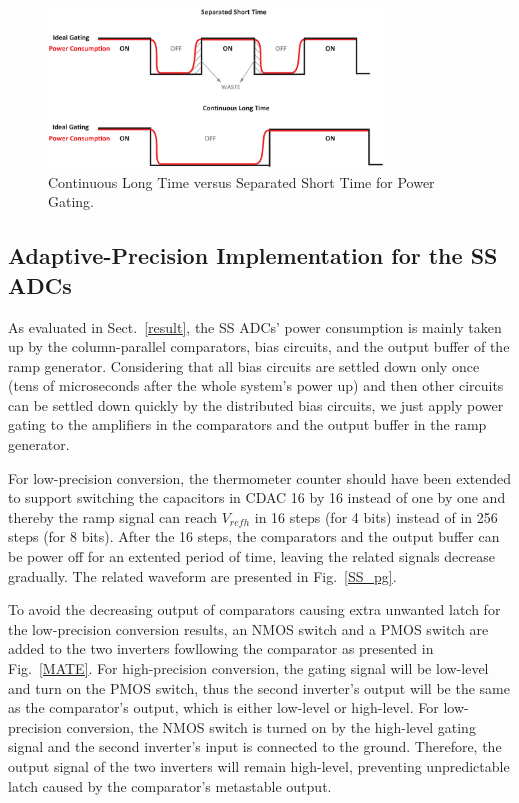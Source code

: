 \begin{figure}[htbp]
	\centerline{\includegraphics[width=3.5in]{./Figures/TIME.eps}}
	\caption{Continuous Long Time versus Separated Short Time for Power Gating.}
	\label{TIME}
\end{figure}  

\subsection{Adaptive-Precision Implementation for the SS ADCs}

As evaluated in Sect.~\ref{result}, the SS ADCs’ power consumption is mainly taken up by the column-parallel comparators, bias circuits, and the output buffer of the ramp generator. 
Considering that all bias circuits are settled down only once (tens of microseconds after the whole system's power up) and then other circuits can be settled down quickly by the distributed 
bias circuits, we just apply power gating to the amplifiers in the comparators and the output buffer in the ramp generator.

For low-precision conversion, the thermometer counter should have been extended to support switching the capacitors in CDAC 16 by 16 instead of one by one and thereby the ramp signal can reach $V_{refh}$ in 16 steps (for 4 bits) instead of in 256 steps (for 8 bits). 
After the 16 steps, the comparators and the output buffer can be power off for an extented period of time, leaving the related signals decrease gradually.
The related waveform are presented in Fig.~\ref{SS_pg}. 

To avoid the decreasing output of comparators causing extra unwanted latch for the low-precision conversion results, an NMOS switch and a PMOS switch are added to the two inverters fowllowing the comparator as presented in Fig.~\ref{MATE}. 
For high-precision conversion, the gating signal will be low-level and turn on the PMOS switch, thus the second inverter's output will be the same as the comparator's output, which is either low-level or high-level. 
For low-precision conversion, the NMOS switch is turned on by the high-level gating signal and the second inverter's input is connected to the ground. Therefore, the output signal of the two inverters will remain high-level, preventing unpredictable latch caused by the comparator's metastable output.

